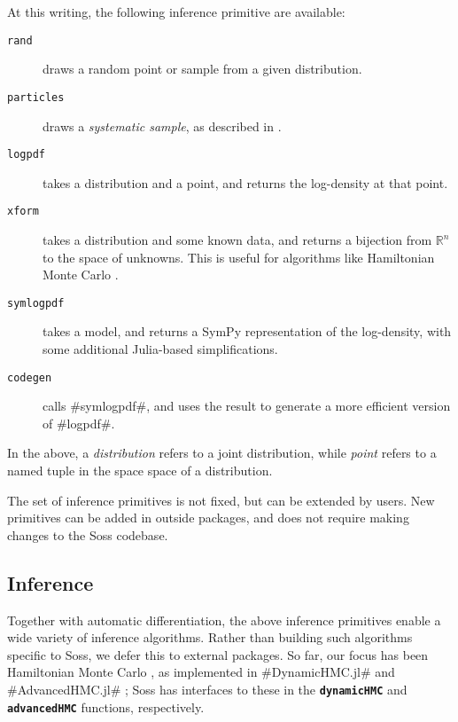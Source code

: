 \documentclass[anonymous=false, %
               format=acmsmall, %
               review=true, %
               screen=true, %
               nonacm=true]{acmart}
\begin{document}
At this writing, the following inference primitive are available:

\begin{description}  
    \item[\texttt{rand}] draws a random point or sample from a given distribution.
    \item[\texttt{particles}] draws a \emph{systematic sample}, as described in \cite{Douc2005}.
    \item[\texttt{logpdf}] takes a distribution and a point, and returns the log-density at that point.
    \item[\texttt{xform}] takes a distribution and some known data, and returns a bijection from $\mathbb{R}^n$ to the space of unknowns. This is useful for algorithms like Hamiltonian Monte Carlo \cite{Neal2011}.
    \item[\texttt{symlogpdf}] takes a model, and returns a SymPy \cite{10.7717/peerj-cs.103} representation of the log-density, with some additional Julia-based simplifications.
    \item[\texttt{codegen}] calls \jl#symlogpdf#, and uses the result to generate a more efficient version of \jl#logpdf#.
\end{description}

In the above, a \emph{distribution} refers to a joint distribution, while \emph{point} refers to a named tuple in the space space of a distribution.


The set of inference primitives is not fixed, but can be extended by users. New primitives can be added in outside packages, and does not require making changes to the Soss codebase. 

\subsection{Inference}

Together with automatic differentiation, the above inference primitives enable a wide variety of inference algorithms. Rather than building such algorithms specific to Soss, we defer this to external packages. So far, our focus has been Hamiltonian Monte Carlo \cite{Neal2011}, as implemented in \jl#DynamicHMC.jl# \cite{tamas_k_papp_2019_3590018} and \jl#AdvancedHMC.jl# \cite{ge2018t}; Soss has interfaces to these in the {\bf \texttt{dynamicHMC}} and {\bf \texttt{advancedHMC}} functions, respectively.
\end{document}
